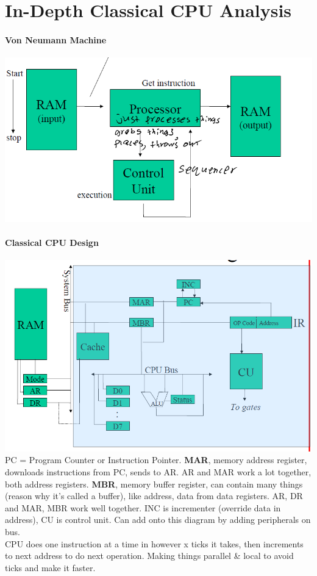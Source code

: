 \documentclass[12 pt]{article}
\begin{document}
	\section{In-Depth Classical CPU Analysis}
	\paragraph{Von Neumann Machine}
	\includegraphics[scale=0.5]{vnm}
	\paragraph{Classical CPU Design}
	\includegraphics[scale=0.5]{ccpud} 
	PC = Program Counter or Instruction Pointer.
	\textbf{MAR}, memory address register, downloads instructions from PC, sends to AR. AR and MAR work a lot together, both address registers.
	\textbf{MBR}, memory buffer register, can contain many things (reason why it's called a buffer), like address, data from data registers. AR, DR and MAR, MBR work well together. INC is incrementer (override data in address), CU is control unit. Can add onto this diagram by adding peripherals on bus.
	\\ CPU does one instruction at a time in however x ticks it takes, then increments to next address to do next operation. Making things parallel \& local to avoid ticks and make it faster.
\end{document}
